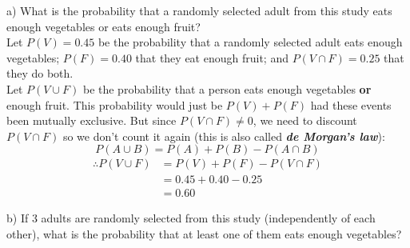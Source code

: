 \documentclass[boxes, qed]{homework}
\begin{document}
\begin{solution}
  a) What is the probability that a randomly selected adult 
  from this study eats enough vegetables or eats enough fruit?\\

  Let $P(V) = 0.45$ be the probability that a randomly selected
  adult eats enough vegetables; $P(F) = 0.40$ that they eat enough
  fruit; and $P(V \cap F) = 0.25$ that they do both.\\

  Let $P(V \cup {F})$ be the probability that a person eats
  enough vegetables \textbf{or} enough fruit. This probability
  would just be $P(V) + P(F)$ had these events been mutually exclusive.
  But since $P(V \cap F) \ne 0$, we need to discount $P(V \cap F)$
  so we don't count it again (this is also called \textbf{\textit{de Morgan's law}}):
  \begin{equation}
    P(A \cup B) = P(A) + P(B) - P(A \cap B)
  \end{equation}
  \begin{align*}
    \therefore P(V \cup F) &= P(V) + P(F) - P(V \cap F)\\
    &= 0.45 + 0.40 - 0.25\\
    &= \boxed{0.60}
  \end{align*}

  b) If 3 adults are randomly selected from this study 
  (independently of each other), what is the probability that
  at least one of them eats enough vegetables?
\end{solution}
\end{document}

